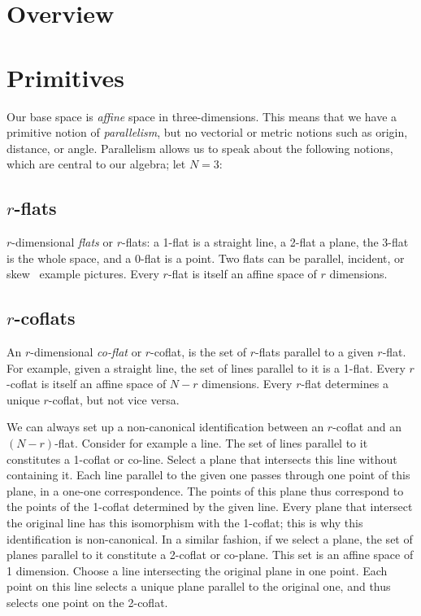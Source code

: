 \documentclass[\ifafour a4paper,12pt,\else a5paper,10pt,\fi%
onecolumn,oneside,article,%
british%
]{memoir}
\theoremstyle{remark}
\theoremstyle{innote}
\renewcommand*{\|}{\nonscript\,\vert\nonscript\;\mathopen{}}
\newcommand*{\puzzle}{{\fontencoding{U}\fontfamily{fontawesometwo}\selectfont\symbol{225}}}
\newcommand{\mynote}[1]{ {\color{notecolour}\puzzle\ #1}}
\newcommand*{\yr}{r}
\newcommand*{\yN}{N}
\begin{document}
\section{Overview}
\label{sec:overview}



\section{Primitives}
\label{sec:primitives}

Our base space is \emph{affine} space in three-dimensions. This means that
we have a primitive notion of \emph{parallelism}, but no vectorial or
metric notions such as origin, distance, or angle. Parallelism allows us to
speak about the following notions, which are central to our algebra; let
$\yN=3$:

\subsection{$\yr$-flats}
\label{sec:flats}

$\yr$-dimensional \emph{flats} or $\yr$-flats: a 1-flat is a straight line,
a 2-flat a plane, the 3-flat is the whole space, and a 0-flat is a point.
Two flats can be parallel, incident, or skew \mynote{example pictures}.
Every $\yr$-flat is itself an affine space of $\yr$ dimensions.

\subsection{$\yr$-coflats}
\label{sec:coflats}

An $\yr$-dimensional \emph{co-flat} or $\yr$-coflat, is the set of
$\yr$-flats parallel to a given $\yr$-flat. For example, given a straight
line, the set of lines parallel to it is a 1-flat. Every $\yr$-coflat is
itself an affine space of $\yN-\yr$ dimensions. Every $\yr$-flat determines
a unique $\yr$-coflat, but not vice versa.

We can always set up a non-canonical identification between an $\yr$-coflat
and an $(\yN-\yr)$-flat. Consider for example a line. The set of lines
parallel to it constitutes a 1-coflat or co-line. Select a plane that
intersects this line without containing it. Each line parallel to the given
one passes through one point of this plane, in a one-one correspondence.
The points of this plane thus correspond to the points of the 1-coflat
determined by the given line. Every plane that intersect the original line
has this isomorphism with the 1-coflat; this is why this identification is
non-canonical. In a similar fashion, if we select a plane, the set of
planes parallel to it constitute a 2-coflat or co-plane. This set is an
affine space of 1 dimension. Choose a line intersecting the original plane
in one point. Each point on this line selects a unique plane parallel to
the original one, and thus selects one point on the 2-coflat.
\end{document}
